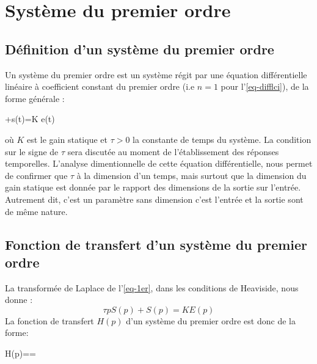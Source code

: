 \section{Système du premier ordre}

\subsection{Définition d'un système du premier ordre}
Un système du premier ordre est un système régit par une équation
différentielle linéaire à coefficient constant du premier ordre 
(i.e $n=1$ pour l'\cref{eq-difflci}), de la forme générale :
\begin{bequation}
    \tau{}+s(t)=K e(t)\label{eq-1er}
\end{bequation}
où $K$ est le gain statique et $\tau>0$ la constante de 
temps du système. La condition sur le signe de $\tau$ sera 
discutée au moment de l'établissement des réponses temporelles.
L'analyse dimentionnelle de cette équation différentielle, nous permet 
de confirmer que $\tau$ à la dimension d'un temps, mais surtout que 
la dimension du gain statique est donnée par le rapport des dimensions de 
la sortie sur l'entrée. Autrement dit, c'est un paramètre sans dimension 
c'est l'entrée et la sortie sont de même nature.


\subsection{Fonction de transfert d'un système du premier ordre}
La transformée de Laplace de l'\cref{eq-1er}, dans les conditions de Heaviside, nous donne :
$$
\tau pS(p)+S(p)=KE(p)
$$
La fonction de transfert $H(p)$ d'un système du premier ordre est donc de la forme:
\begin{bequation}
    H(p)==\label{eq-ft1er}
\end{bequation}

